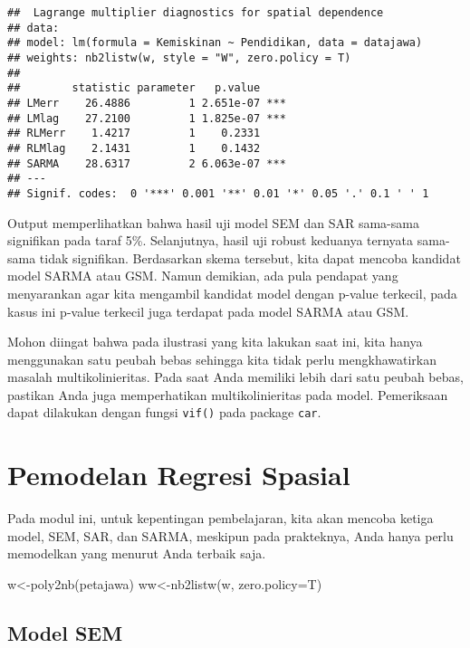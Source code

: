 \documentclass[
]{book}
\newenvironment{Shaded}{\begin{snugshade}}{\end{snugshade}}
\newcommand{\AttributeTok}[1]{\textcolor[rgb]{0.77,0.63,0.00}{#1}}
\newcommand{\FunctionTok}[1]{\textcolor[rgb]{0.00,0.00,0.00}{#1}}
\newcommand{\NormalTok}[1]{#1}
\newcommand{\OtherTok}[1]{\textcolor[rgb]{0.56,0.35,0.01}{#1}}
\begin{document}
\begin{verbatim}
##  Lagrange multiplier diagnostics for spatial dependence
## data:  
## model: lm(formula = Kemiskinan ~ Pendidikan, data = datajawa)
## weights: nb2listw(w, style = "W", zero.policy = T)
##  
##        statistic parameter   p.value    
## LMerr    26.4886         1 2.651e-07 ***
## LMlag    27.2100         1 1.825e-07 ***
## RLMerr    1.4217         1    0.2331    
## RLMlag    2.1431         1    0.1432    
## SARMA    28.6317         2 6.063e-07 ***
## ---
## Signif. codes:  0 '***' 0.001 '**' 0.01 '*' 0.05 '.' 0.1 ' ' 1
\end{verbatim}

Output memperlihatkan bahwa hasil uji model SEM dan SAR sama-sama signifikan pada taraf 5\%. Selanjutnya, hasil uji robust keduanya ternyata sama-sama tidak signifikan. Berdasarkan skema tersebut, kita dapat mencoba kandidat model SARMA atau GSM. Namun demikian, ada pula pendapat yang menyarankan agar kita mengambil kandidat model dengan p-value terkecil, pada kasus ini p-value terkecil juga terdapat pada model SARMA atau GSM.

Mohon diingat bahwa pada ilustrasi yang kita lakukan saat ini, kita hanya menggunakan satu peubah bebas sehingga kita tidak perlu mengkhawatirkan masalah multikolinieritas. Pada saat Anda memiliki lebih dari satu peubah bebas, pastikan Anda juga memperhatikan multikolinieritas pada model. Pemeriksaan dapat dilakukan dengan fungsi \texttt{vif()} pada package \texttt{car}.

\hypertarget{pemodelan-regresi-spasial}{%
\section{Pemodelan Regresi Spasial}\label{pemodelan-regresi-spasial}}

Pada modul ini, untuk kepentingan pembelajaran, kita akan mencoba ketiga model, SEM, SAR, dan SARMA, meskipun pada prakteknya, Anda hanya perlu memodelkan yang menurut Anda terbaik saja.

\begin{Shaded}
\begin{Highlighting}[]
\NormalTok{w}\OtherTok{\textless{}{-}}\FunctionTok{poly2nb}\NormalTok{(petajawa)}
\NormalTok{ww}\OtherTok{\textless{}{-}}\FunctionTok{nb2listw}\NormalTok{(w, }\AttributeTok{zero.policy=}\NormalTok{T)}
\end{Highlighting}
\end{Shaded}

\hypertarget{model-sem}{%
\subsection{Model SEM}\label{model-sem}}
\end{document}
